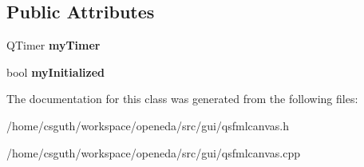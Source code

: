 \subsection*{Public Attributes}
\begin{DoxyCompactItemize}
\item 
\hypertarget{classophidian_1_1gui_1_1QSFMLCanvas_a2d35f2eb02a04ad817cd611556a11c85}{Q\-Timer {\bfseries my\-Timer}}\label{classophidian_1_1gui_1_1QSFMLCanvas_a2d35f2eb02a04ad817cd611556a11c85}

\item 
\hypertarget{classophidian_1_1gui_1_1QSFMLCanvas_a1cdb767595f84cb88e5075c3e86fc497}{bool {\bfseries my\-Initialized}}\label{classophidian_1_1gui_1_1QSFMLCanvas_a1cdb767595f84cb88e5075c3e86fc497}

\end{DoxyCompactItemize}


The documentation for this class was generated from the following files\-:\begin{DoxyCompactItemize}
\item 
/home/csguth/workspace/openeda/src/gui/qsfmlcanvas.\-h\item 
/home/csguth/workspace/openeda/src/gui/qsfmlcanvas.\-cpp\end{DoxyCompactItemize}
